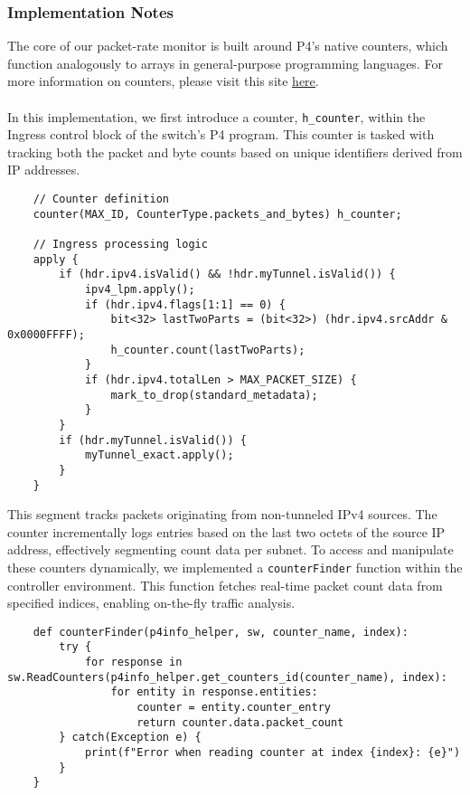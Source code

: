 \subsubsection{Implementation Notes}
The core of our packet-rate monitor is built around P4's native counters, which function analogously to arrays in general-purpose programming languages. For more information on counters, please visit this site \href{https://cornell-pl.github.io/cs6114/lecture07.html}{\underline{here}}. \\
\\
In this implementation, we first introduce a counter, \verb|h_counter|, within the Ingress control block of the switch's P4 program. This counter is tasked with tracking both the packet and byte counts based on unique identifiers derived from IP addresses.
\begin{lstlisting}
    // Counter definition
    counter(MAX_ID, CounterType.packets_and_bytes) h_counter;
    
    // Ingress processing logic
    apply {
        if (hdr.ipv4.isValid() && !hdr.myTunnel.isValid()) {
            ipv4_lpm.apply();
            if (hdr.ipv4.flags[1:1] == 0) {
                bit<32> lastTwoParts = (bit<32>) (hdr.ipv4.srcAddr & 0x0000FFFF);
                h_counter.count(lastTwoParts);
            }
            if (hdr.ipv4.totalLen > MAX_PACKET_SIZE) {
                mark_to_drop(standard_metadata);
            }
        }
        if (hdr.myTunnel.isValid()) {
            myTunnel_exact.apply();
        }
    }
\end{lstlisting}
This segment tracks packets originating from non-tunneled IPv4 sources. The counter incrementally logs entries based on the last two octets of the source IP address, effectively segmenting count data per subnet. To access and manipulate these counters dynamically, we implemented a \verb|counterFinder| function within the controller environment. This function fetches real-time packet count data from specified indices, enabling on-the-fly traffic analysis.
\begin{lstlisting}
    def counterFinder(p4info_helper, sw, counter_name, index):
        try {
            for response in sw.ReadCounters(p4info_helper.get_counters_id(counter_name), index):
                for entity in response.entities:
                    counter = entity.counter_entry
                    return counter.data.packet_count
        } catch(Exception e) {
            print(f"Error when reading counter at index {index}: {e}")
        }
    }
\end{lstlisting}

